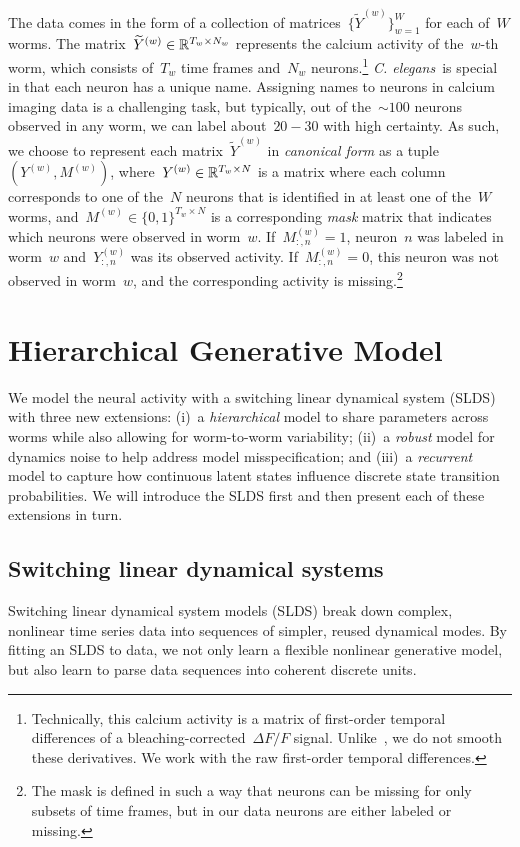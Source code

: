 \documentclass[11pt]{article}
\newcommand{\celegans}{\textit{C. elegans}}
\begin{document}
The data comes in the form of a collection of matrices~$\{\widetilde{Y}^{(w)}\}_{w=1}^W$
for each of~$W$ worms.  The matrix~${\widetilde{Y}^{(w)} \in \mathbb{R}^{T_w \times N_w}}$
represents the calcium activity of the~$w$-th worm, which consists of~$T_w$
time frames and~$N_w$ neurons.\footnote{Technically, this calcium activity is
a matrix of first-order temporal differences of a
bleaching-corrected~$\Delta F /F$ signal. Unlike~\citet{kato2015global}, we
do not smooth these derivatives. We work with the raw first-order
temporal differences.}  \celegans~is special in that each neuron has a unique
name.  Assigning names to neurons in calcium imaging data is a challenging
task, but typically, out of the~${\sim 100}$ neurons observed in any worm,
we can label about~$20-30$ with high certainty.  As such, we choose to
represent each matrix~$\widetilde{Y}^{(w)}$ in \emph{canonical form} as a
tuple~$(Y^{(w)}, M^{(w)})$, where~${Y^{(w)} \in \mathbb{R}^{T_w \times N}}$ is
a matrix where each column corresponds to one of the~$N$ neurons that is
identified in at least one of the~$W$ worms, and~${M^{(w)} \in \{0,1\}^{T_w \times N}}$
is a corresponding \emph{mask} matrix that indicates which neurons were
observed in worm~$w$.  If~$M_{:,n}^{(w)} = 1$, neuron~$n$ was labeled in
worm~$w$ and~$Y_{:,n}^{(w)}$ was its observed activity.  If~$M_{:,n}^{(w)}=0$,
this neuron was not observed in worm~$w$, and the corresponding activity
is missing.\footnote{The mask is defined in such a way that neurons can
  be missing for only subsets of time frames, but in our data neurons are
  either labeled or missing.}

\section{Hierarchical Generative Model}

We model the neural activity with a switching linear
dynamical system (SLDS) with three new extensions: (i)~a \emph{hierarchical} model
to share parameters across worms while also allowing for worm-to-worm
variability; (ii)~a \emph{robust} model for dynamics noise to help address
model misspecification; and (iii)~a \emph{recurrent} model to capture
how continuous latent states influence discrete state transition probabilities.
We will introduce the SLDS first and then present each of these extensions
in turn.


\subsection{Switching linear dynamical systems}
\label{sec:slds}
Switching linear dynamical system models (SLDS) break down complex, nonlinear
time series data into sequences of simpler, reused dynamical modes.
By fitting an SLDS to data, we not only learn a flexible nonlinear generative
model, but also learn to parse data sequences into coherent discrete units.
\end{document}
